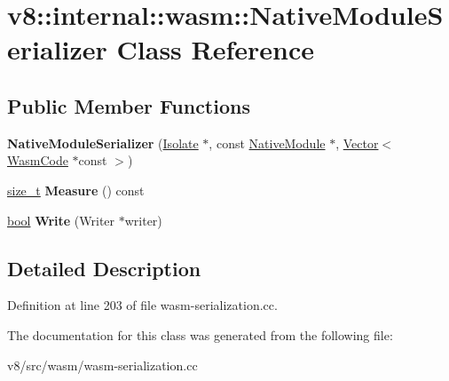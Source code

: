 \hypertarget{classv8_1_1internal_1_1wasm_1_1NativeModuleSerializer}{}\section{v8\+:\+:internal\+:\+:wasm\+:\+:Native\+Module\+Serializer Class Reference}
\label{classv8_1_1internal_1_1wasm_1_1NativeModuleSerializer}
\subsection*{Public Member Functions}
\begin{DoxyCompactItemize}
\item 
\mbox{\label{classv8_1_1internal_1_1wasm_1_1NativeModuleSerializer_ae1af2420eb9d219e21aa154163e6e9bc}} 
{\bfseries Native\+Module\+Serializer} (\mbox{\hyperlink{classv8_1_1internal_1_1Isolate}{Isolate}} $\ast$, const \mbox{\hyperlink{classv8_1_1internal_1_1wasm_1_1NativeModule}{Native\+Module}} $\ast$, \mbox{\hyperlink{classv8_1_1internal_1_1Vector}{Vector}}$<$ \mbox{\hyperlink{classv8_1_1internal_1_1wasm_1_1WasmCode}{Wasm\+Code}} $\ast$const $>$)
\item 
\mbox{\label{classv8_1_1internal_1_1wasm_1_1NativeModuleSerializer_a1c47773e83ce3e3a617dc2b5f3a1e33d}} 
\mbox{\hyperlink{classsize__t}{size\+\_\+t}} {\bfseries Measure} () const
\item 
\mbox{\label{classv8_1_1internal_1_1wasm_1_1NativeModuleSerializer_a64d3db595484b11eb47a747453edefa8}} 
\mbox{\hyperlink{classbool}{bool}} {\bfseries Write} (Writer $\ast$writer)
\end{DoxyCompactItemize}


\subsection{Detailed Description}


Definition at line 203 of file wasm-\/serialization.\+cc.



The documentation for this class was generated from the following file\+:\begin{DoxyCompactItemize}
\item 
v8/src/wasm/wasm-\/serialization.\+cc\end{DoxyCompactItemize}
